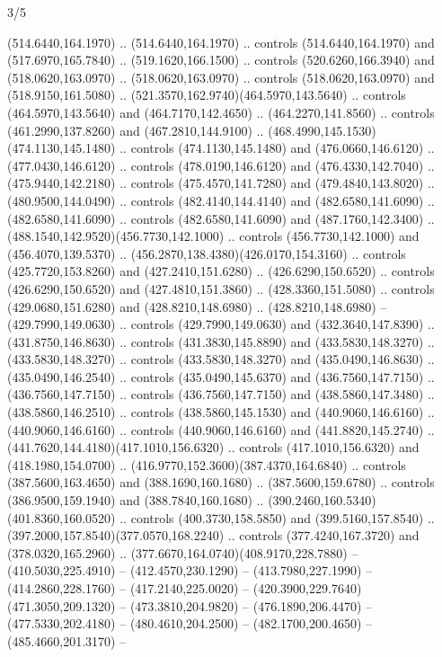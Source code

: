 \begin{flagdescription}{3/5}
\begin{scope}[shift={(0.5\flaglength,0.5\flagwidth)},scale=\flagwidth/510]
\begin{scope}[y=0.80pt, x=0.80pt, yscale=-1.06, xscale=1.06,yshift=-240pt,xshift=-400pt]
\begin{scope}[cm={{0.83333,0.0,0.0,0.83333,(154.64672,48.64761)}}]
\begin{scope}[cm={{0.93334,0.0,0.0,0.93334,(-4.86471,22.64035)}}]
\begin{scope}[line width=0.489\lw]
\begin{scope}[draw=c004b00]
  (514.6440,164.1970) .. (514.6440,164.1970) .. controls (514.6440,164.1970) and
  (517.6970,165.7840) .. (519.1620,166.1500) .. controls (520.6260,166.3940) and
  (518.0620,163.0970) .. (518.0620,163.0970) .. controls (518.0620,163.0970) and
  (518.9150,161.5080) .. (521.3570,162.9740)(464.5970,143.5640) .. controls
  (464.5970,143.5640) and (464.7170,142.4650) .. (464.2270,141.8560) .. controls
  (461.2990,137.8260) and (467.2810,144.9100) ..
  (468.4990,145.1530)(474.1130,145.1480) .. controls (474.1130,145.1480) and
  (476.0660,146.6120) .. (477.0430,146.6120) .. controls (478.0190,146.6120) and
  (476.4330,142.7040) .. (475.9440,142.2180) .. controls (475.4570,141.7280) and
  (479.4840,143.8020) .. (480.9500,144.0490) .. controls (482.4140,144.4140) and
  (482.6580,141.6090) .. (482.6580,141.6090) .. controls (482.6580,141.6090) and
  (487.1760,142.3400) .. (488.1540,142.9520)(456.7730,142.1000) .. controls
  (456.7730,142.1000) and (456.4070,139.5370) ..
  (456.2870,138.4380)(426.0170,154.3160) .. controls (425.7720,153.8260) and
  (427.2410,151.6280) .. (426.6290,150.6520) .. controls (426.6290,150.6520) and
  (427.4810,151.3860) .. (428.3360,151.5080) .. controls (429.0680,151.6280) and
  (428.8210,148.6980) .. (428.8210,148.6980) -- (429.7990,149.0630) .. controls
  (429.7990,149.0630) and (432.3640,147.8390) .. (431.8750,146.8630) .. controls
  (431.3830,145.8890) and (433.5830,148.3270) .. (433.5830,148.3270) .. controls
  (433.5830,148.3270) and (435.0490,146.8630) .. (435.0490,146.2540) .. controls
  (435.0490,145.6370) and (436.7560,147.7150) .. (436.7560,147.7150) .. controls
  (436.7560,147.7150) and (438.5860,147.3480) .. (438.5860,146.2510) .. controls
  (438.5860,145.1530) and (440.9060,146.6160) .. (440.9060,146.6160) .. controls
  (440.9060,146.6160) and (441.8820,145.2740) ..
  (441.7620,144.4180)(417.1010,156.6320) .. controls (417.1010,156.6320) and
  (418.1980,154.0700) .. (416.9770,152.3600)(387.4370,164.6840) .. controls
  (387.5600,163.4650) and (388.1690,160.1680) .. (387.5600,159.6780) .. controls
  (386.9500,159.1940) and (388.7840,160.1680) ..
  (390.2460,160.5340)(401.8360,160.0520) .. controls (400.3730,158.5850) and
  (399.5160,157.8540) .. (397.2000,157.8540)(377.0570,168.2240) .. controls
  (377.4240,167.3720) and (378.0320,165.2960) ..
  (377.6670,164.0740)(408.9170,228.7880) -- (410.5030,225.4910) --
  (412.4570,230.1290) -- (413.7980,227.1990) -- (414.2860,228.1760) --
  (417.2140,225.0020) -- (420.3900,229.7640)(471.3050,209.1320) --
  (473.3810,204.9820) -- (476.1890,206.4470) -- (477.5330,202.4180) --
  (480.4610,204.2500) -- (482.1700,200.4650) -- (485.4660,201.3170) --

\end{scope}
\end{scope}
\end{scope}
\end{scope}
\end{scope}
\end{scope}
\end{flagdescription}
